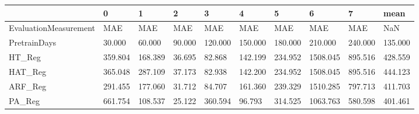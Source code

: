 \begin{tabular}{llllllllll}
\toprule
{} &       0 &       1 &      2 &       3 &       4 &       5 &        6 &       7 &    mean \\
\midrule
EvaluationMeasurement &     MAE &     MAE &    MAE &     MAE &     MAE &     MAE &      MAE &     MAE &     NaN \\
PretrainDays          &  30.000 &  60.000 & 90.000 & 120.000 & 150.000 & 180.000 &  210.000 & 240.000 & 135.000 \\
HT\_Reg                & 359.804 & 168.389 & 36.695 &  82.868 & 142.199 & 234.952 & 1508.045 & 895.516 & 428.559 \\
HAT\_Reg               & 365.048 & 287.109 & 37.173 &  82.938 & 142.200 & 234.952 & 1508.045 & 895.516 & 444.123 \\
ARF\_Reg               & 291.455 & 177.060 & 31.712 &  84.707 & 161.360 & 239.329 & 1510.285 & 797.713 & 411.703 \\
PA\_Reg                & 661.754 & 108.537 & 25.122 & 360.594 &  96.793 & 314.525 & 1063.763 & 580.598 & 401.461 \\
\bottomrule
\end{tabular}
